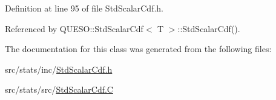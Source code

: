 Definition at line 95 of file Std\-Scalar\-Cdf.\-h.



Referenced by Q\-U\-E\-S\-O\-::\-Std\-Scalar\-Cdf$<$ T $>$\-::\-Std\-Scalar\-Cdf().



The documentation for this class was generated from the following files\-:\begin{DoxyCompactItemize}
\item 
src/stats/inc/\hyperlink{_std_scalar_cdf_8h}{Std\-Scalar\-Cdf.\-h}\item 
src/stats/src/\hyperlink{_std_scalar_cdf_8_c}{Std\-Scalar\-Cdf.\-C}\end{DoxyCompactItemize}
